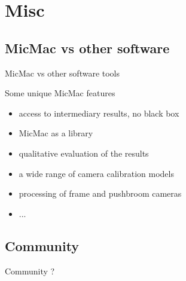 \documentclass{beamer}
\begin{document}
	\section{Misc}
	\subsection*{MicMac vs other software}
		\begin{frame}{MicMac vs other software tools}
		
		Some unique MicMac features 
		\begin{itemize}
		\item access to intermediary results, no black box
		\item MicMac as a library
		\item qualitative evaluation of the results
		\item a wide range of camera calibration models
		\item processing of frame and pushbroom cameras
		\item ...
		\end{itemize}
		
		
		\end{frame}



		\subsection*{Community}
		\begin{frame}{Community}
			?
		\end{frame}		 
\end{document}
